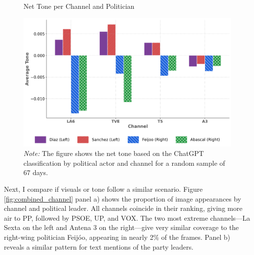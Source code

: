 \documentclass[12pt]{article}
\begin{document}
\begin{figure}[htbp!]
	\caption{Net Tone per Channel and Politician}
	\centering
	\includegraphics[width=150mm]{figures/politicians_tone_proportions}
	\caption*{\small \textit{Note:} The figure shows the net tone based on the ChatGPT classification by political actor and channel for a random sample of 67 days. }
	\label{fig:tone_channel}
\end{figure}





Next, I compare if visuals or tone follow a similar scenario. Figure \ref{fig:combined_channel} panel a) shows the proportion of image appearances by channel and political leader. All channels coincide in their ranking, giving more air to PP, followed by PSOE, UP, and VOX. The two most extreme channels—La Sexta on the left and Antena 3 on the right—give very similar coverage to the right-wing politician Feijóo, appearing in nearly 2\% of the frames. Panel b)  reveals a similar pattern for text mentions of the party leaders.
\end{document}
